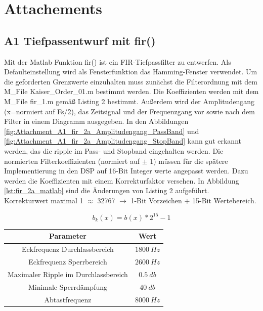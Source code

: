 \section{Attachements}
\subsection{A1 Tiefpassentwurf mit fir()}
\label{cap:A1}
Mit der Matlab Funktion fir() ist ein FIR-Tiefpassfilter zu entwerfen. Als Defaulteinstellung wird als Fensterfunktion das Hamming-Fenster verwendet. Um die geforderten Grenzwerte einzuhalten muss zunächst die Filterordnung mit dem M\_File Kaiser\_Order\_01.m bestimmt werden. Die Koeffizienten werden mit dem M\_File fir\_1.m gemäß Listing 2 bestimmt. Außerdem wird der Amplitudengang (x=normiert auf Fs/2), das Zeitsignal und der Frequenzgang vor sowie nach dem Filter in einem Diagramm ausgegeben. In den Abbildungen \ref{fig:Attachment_A1_fir_2a_Amplitudengang_PassBand} und \ref{fig:Attachment_A1_fir_2a_Amplitudengang_StopBand} kann gut erkannt werden, das die ripple im Pass- und Stopband eingehalten werden. Die normierten Filterkoeffizienten (normiert auf $\pm$ 1) müssen für die spätere Implementierung in den DSP auf 16-Bit Integer werte angepasst werden. Dazu werden die Koeffizienten mit einem Korrekturfaktor versehen. In Abbildung \ref{lst:fir_2a_matlab} sind die Änderungen von Listing 2 aufgeführt.\\Korrekturwert maximal 1 $\approx$ 32767 $\rightarrow$ 1-Bit Vorzeichen + 15-Bit Wertebereich. 

\begin{equation}
b_{k}(x) = b(x) * 2^{15}-1
\end{equation}

\begin{table}[h]
	\centering
	\begin{tabular}{c | c}
		Parameter	& Wert	\\
		\hline
		Eckfrequenz Durchlassbereich			& $1800~Hz$	\\
		Eckfrequenz Sperrbereich				& $2600~Hz$	\\
		Maximaler Ripple im Durchlassbereich	& $0.5~db$	\\
		Minimale Sperrdämpfung					& $40~db$	\\
		Abtastfrequenz							& $8000~Hz$	\\
	\end{tabular}
\end{table}




